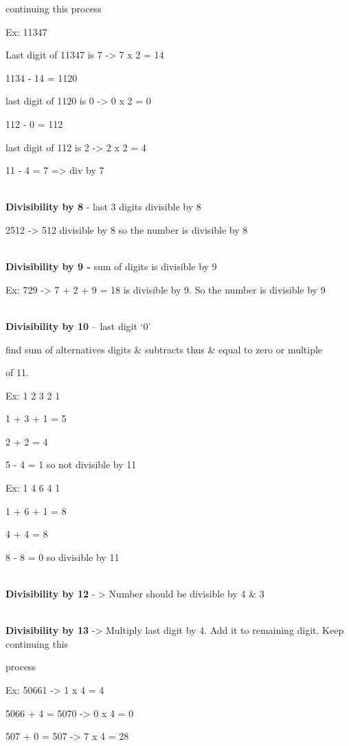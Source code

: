 \documentclass[
]{article}
\begin{document}
continuing this process

Ex: 11347

Last digit of 11347 is 7 -\textgreater{} 7 x 2 = 14

1134 - 14 = 1120

last digit of 1120 is 0 -\textgreater{} 0 x 2 = 0

112 - 0 = 112

last digit of 112 is 2 -\textgreater{} 2 x 2 = 4

11 - 4 = 7 =\textgreater{} div by 7

\textbf{\\ Divisibility by 8} - last 3 digits divisible by 8

2512 -\textgreater{} 512 divisible by 8 so the number is divisible by 8

\textbf{\\ Divisibility by 9 -} sum of digits is divisible by 9

Ex: 729 -\textgreater{} 7 + 2 + 9 = 18 is divisible by 9. So the number
is divisible by 9

\textbf{\\ Divisibility by 10} -- last digit `0'







find sum of alternatives
digits \& subtracts thus \& equal to zero or multiple


of 11.

Ex: 1 2 3 2 1

1 + 3 + 1 = 5

2 + 2 = 4

5 - 4 = 1 so not divisible by 11

Ex: 1 4 6 4 1

1 + 6 + 1 = 8

4 + 4 = 8

8 - 8 = 0 so divisible by 11

\textbf{\\ Divisibility by 12} - \textgreater{} Number should be divisible
by 4 \& 3


\textbf{\\ Divisibility by 13} -\textgreater{} Multiply last digit by 4.
Add it to remaining digit. Keep continuing this


process

Ex: 50661 -\textgreater{} 1 x 4 = 4

5066 + 4 = 5070 -\textgreater{} 0 x 4 = 0

507 + 0 = 507 -\textgreater{} 7 x 4 = 28
\end{document}
